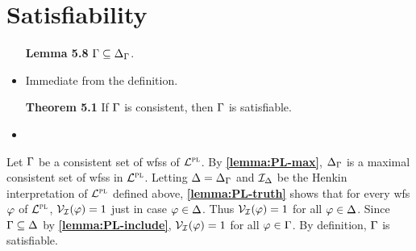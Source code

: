 \documentclass[a4paper, 11pt]{article} %
\begin{document}
  




\section*{Satisfiability}

\begin{itemize}
  \item[\bf Lemma 5.8] $\Gamma\subseteq\Delta_{\Gamma}$.
    \item Immediate from the definition.
  \item[\bf Theorem 5.1] If $\Gamma$ is consistent, then $\Gamma$ is satisfiable.
    \item 
\end{itemize}


  Let $\Gamma$ be a consistent set of wfss of $\mathcal{L}^{\textsc{pl}}$.
  By \textbf{\ref{lemma:PL-max}}, $\Delta_{\Gamma}$ is a maximal consistent set of wfss in $\mathcal{L}^{\textsc{pl}}$.
  Letting $\Delta=\Delta_{\Gamma}$ and $\mathcal{I}_{\Delta}$ be the Henkin interpretation of $\mathcal{L}^{\textsc{pl}}$ defined above, \textbf{\ref{lemma:PL-truth}} shows that for every wfs $\varphi$ of $\mathcal{L}^{\textsc{pl}}$, $\mathcal{V}_{\mathcal{I}}(\varphi) = 1$ just in case $\varphi \in \Delta$.
  Thus $\mathcal{V}_{\mathcal{I}}(\varphi) = 1$ for all $\varphi \in \Delta$.
  Since $\Gamma \subseteq \Delta$ by \textbf{\ref{lemma:PL-include}}, $\mathcal{V}_{\mathcal{I}}(\varphi) = 1$ for all $\varphi \in \Gamma$.
  By definition, $\Gamma$ is satisfiable.




%
\end{document}
